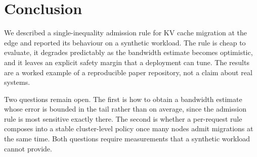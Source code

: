 \section{Conclusion}
\label{sec:conclusion}

We described a single-inequality admission rule for KV cache migration at the edge and reported its behaviour on a synthetic workload.
The rule is cheap to evaluate, it degrades predictably as the bandwidth estimate becomes optimistic, and it leaves an explicit safety margin that a deployment can tune.
The results are a worked example of a reproducible paper repository, not a claim about real systems.

Two questions remain open.
The first is how to obtain a bandwidth estimate whose error is bounded in the tail rather than on average, since the admission rule is most sensitive exactly there.
The second is whether a per-request rule composes into a stable cluster-level policy once many nodes admit migrations at the same time.
Both questions require measurements that a synthetic workload cannot provide.
